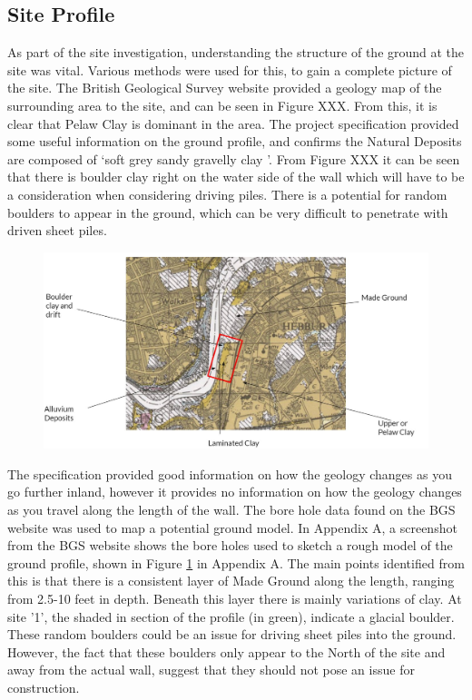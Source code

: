 \documentclass[12pt, a4paper]{article}
\begin{document}
\subsection{Site Profile}
As part of the site investigation, understanding the structure of the ground at the site was vital. Various methods were used for this, to gain a complete picture of the site. The British Geological Survey website provided a geology map of the surrounding area to the site, and can be seen in Figure XXX. From this, it is clear that Pelaw Clay is dominant in the area. The project specification provided some useful information on the ground profile, and confirms the Natural Deposits are composed of `soft grey sandy gravelly clay \cite{b}'. From Figure XXX it can be seen that there is boulder clay right on the water side of the wall which will have to be a consideration when considering driving piles. There is a potential for random boulders to appear in the ground, which can be very difficult to penetrate with driven sheet piles.
\begin{figure}[H]
  \centering
  	\includegraphics[width=0.5\textheight]{goodgeomap}
   	\caption{}
	\label{length}
\end{figure}

\begin{justify}
The specification provided good information on how the geology changes as you go further inland, however it provides no information on how the geology changes as you travel along the length of the wall. The bore hole data found on the BGS website was used to map a potential ground model. In Appendix A, a screenshot from the BGS website shows the bore holes used to sketch a rough model of the ground profile, shown in Figure \ref{length} in Appendix A. The main points identified from this is that there is a consistent layer of Made Ground along the length, ranging from 2.5-10 feet in depth. Beneath this layer there is mainly variations of clay. At site '1', the shaded in section of the profile (in green), indicate a glacial boulder. These random boulders could be an issue for driving sheet piles into the ground. However, the fact that these boulders only appear to the North of the site and away from the actual wall, suggest that they should not pose an issue for construction.  
\end{justify}
\end{document}
